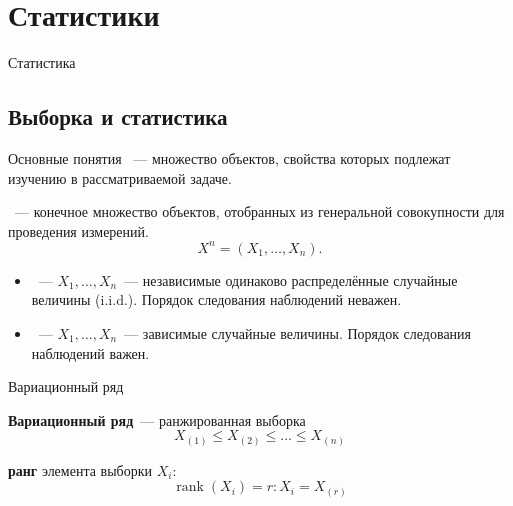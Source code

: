 \documentclass[11pt,pdf,utf8,hyperref={unicode},aspectratio=169]{beamer}
\DeclareMathOperator{\rank}{rank}
\begin{document}
\section{Статистики}
\begin{frame}{}
\centering
\huge Статистика
\end{frame}

\subsection{Выборка и статистика}
\begin{frame}{Основные понятия}
    ~--- множество объектов, свойства которых подлежат изучению в рассматриваемой задаче.

    \bigskip

    ~--- конечное множество объектов, отобранных из генеральной совокупности для проведения измерений.
    $$
        X^n=\left(X_1,\dots,X_n\right).
    $$

    \bigskip
    \begin{itemize}
    \item {}~--- $X_1,\dots,X_n$~--- независимые одинаково распределённые случайные величины (i.i.d.). Порядок следования наблюдений неважен.
    \item {}~--- $X_1,\dots,X_n$~--- зависимые случайные величины. Порядок следования наблюдений важен.
    \end{itemize}
    \bigskip



\end{frame}
\begin{frame}{Вариационный ряд}

    \textbf{Вариационный ряд}~--- ранжированная выборка
    $$X_{(1)}\leqslant X_{(2)} \leqslant \dots \leqslant X_{(n)}$$

    \textbf{ранг} элемента выборки $X_i$:
    $$\rank\left(X_i\right)=r\colon X_i=X_{(r)}$$

\end{frame}
\end{document}
